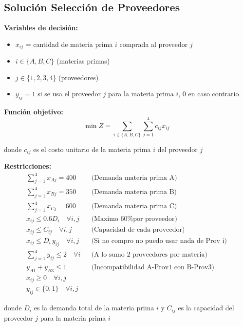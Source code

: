 \documentclass[12pt]{article}
\begin{document}
\subsection{Solución Selección de Proveedores}

\textbf{Variables de decisión:}
\begin{itemize}
    \item $x_{ij}$ = cantidad de materia prima $i$ comprada al proveedor $j$
    \item $i \in \{A, B, C\}$ (materias primas)
    \item $j \in \{1, 2, 3, 4\}$ (proveedores)
    \item $y_{ij} = 1$ si se usa el proveedor $j$ para la materia prima $i$, 0 en caso contrario
\end{itemize}

\textbf{Función objetivo:}
$$\min Z = \sum_{i \in \{A,B,C\}} \sum_{j=1}^{4} c_{ij} x_{ij}$$
\begin{center}
donde $c_{ij}$ es el costo unitario de la materia prima $i$ del proveedor $j$
\end{center}

\textbf{Restricciones:}
\begin{align*}
    \sum_{j=1}^{4} x_{Aj} = 400 && \text{(Demanda materia prima A)} \\
    \sum_{j=1}^{4} x_{Bj} = 350 && \text{(Demanda materia prima B)} \\
    \sum_{j=1}^{4} x_{Cj} = 600 && \text{(Demanda materia prima C)} \\
    x_{ij} \leq 0.6D_i \quad \forall i,j && \text{(Maximo 60\% por proveedor)} \\
    x_{ij} \leq C_{ij} \quad \forall i,j && \text{(Capacidad de cada proveedor)} \\
    x_{ij} \leq D_i\, y_{ij} \quad \forall i,j && \text{(Si no compro no puedo usar nada de Prov i)} \\
    \sum_{j=1}^{4} y_{ij} \leq 2 \quad \forall i && \text{(A lo sumo 2 proveedores por materia)} \\
    y_{A1} + y_{B3} \leq 1 && \text{(Incompatibilidad A-Prov1 con B-Prov3)} \\
    x_{ij} \geq 0 \quad \forall i,j \\
    y_{ij} \in \{0,1\} \quad \forall i,j
\end{align*}
\begin{center}
donde $D_i$ es la demanda total de la materia prima $i$ y $C_{ij}$ es la capacidad del proveedor $j$ para la materia prima $i$
\end{center}
\end{document}
